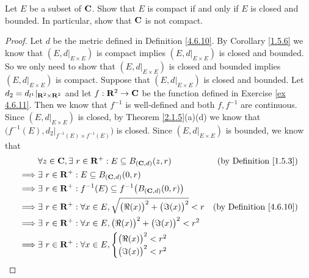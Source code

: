 \begin{exercise}\label{ex 4.6.13}
    Let \(E\) be a subset of \(\mathbf{C}\).
    Show that \(E\) is compact if and only if \(E\) is closed and bounded.
    In particular, show that \(\mathbf{C}\) is not compact.
\end{exercise}

\begin{proof}
    Let \(d\) be the metric defined in Definition \ref{4.6.10}.
    By Corollary \ref{1.5.6} we know that \((E, d|_{E \times E})\) is compact implies \((E, d|_{E \times E})\) is closed and bounded.
    So we only need to show that \((E, d|_{E \times E})\) is closed and bounded implies \((E, d|_{E \times E})\) is compact.
    Suppose that \((E, d|_{E \times E})\) is closed and bounded.
    Let \(d_2 = d_{l^1}|_{\mathbf{R}^2 \times \mathbf{R}^2}\) and let \(f : \mathbf{R}^2 \to \mathbf{C}\) be the function defined in Exercise \ref{ex 4.6.11}.
    Then we know that \(f^{-1}\) is well-defined and both \(f, f^{-1}\) are continuous.
    Since \((E, d|_{E \times E})\) is closed, by Theorem \ref{2.1.5}(a)(d) we know that \(\big(f^{-1}(E), d_2|_{f^{-1}(E) \times f^{-1}(E)}\big)\) is closed.
    Since \((E, d|_{E \times E})\) is bounded, we know that
    \begin{align*}
                 & \forall z \in \C, \exists\ r \in \R^+ : E \subseteq B_{(\C, d)}(z, r)                     & \text{(by Definition \ref{1.5.3})}  \\
        \implies & \exists\ r \in \R^+ : E \subseteq B_{(\C, d)}(0, r)                                                                             \\
        \implies & \exists\ r \in \R^+ : f^{-1}(E) \subseteq f^{-1}\big(B_{(\C, d)}(0, r)\big)                                                     \\
        \implies & \exists\ r \in \R^+ : \forall x \in E, \sqrt{\big(\Re(x)\big)^2 + \big(\Im(x)\big)^2} < r & \text{(by Definition \ref{4.6.10})} \\
        \implies & \exists\ r \in \R^+ : \forall x \in E, \big(\Re(x)\big)^2 + \big(\Im(x)\big)^2 < r^2                                            \\
        \implies & \exists\ r \in \R^+ : \forall x \in E, \begin{cases}
                                                              \big(\Re(x)\big)^2 < r^2 \\
                                                              \big(\Im(x)\big)^2 < r^2
                                                          \end{cases}                                                                 \\

\end{align*}
\end{proof}
